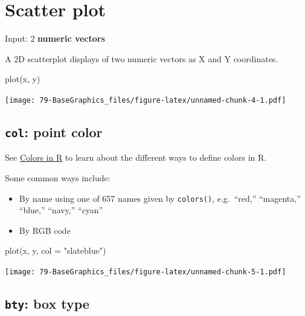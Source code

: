 \documentclass[
]{book}
\newenvironment{Shaded}{\begin{snugshade}}{\end{snugshade}}
\newcommand{\AttributeTok}[1]{\textcolor[rgb]{0.77,0.63,0.00}{#1}}
\newcommand{\FunctionTok}[1]{\textcolor[rgb]{0.00,0.00,0.00}{#1}}
\newcommand{\NormalTok}[1]{#1}
\newcommand{\StringTok}[1]{\textcolor[rgb]{0.31,0.60,0.02}{#1}}
\providecommand{\tightlist}{%
  \setlength{\itemsep}{0pt}\setlength{\parskip}{0pt}}
\begin{document}
\hypertarget{scatter-plot}{%
\section{Scatter plot}\label{scatter-plot}}

Input: 2 \textbf{numeric vectors}

A 2D scatterplot displays of two numeric vectors as X and Y coordinates.

\begin{Shaded}
\begin{Highlighting}[]
\FunctionTok{plot}\NormalTok{(x, y)}
\end{Highlighting}
\end{Shaded}

\texttt{[image: 79-BaseGraphics\_files/figure-latex/unnamed-chunk-4-1.pdf]}

\hypertarget{col-point-color}{%
\subsection{\texorpdfstring{\textbf{\texttt{col}}: point color}{col: point color}}\label{col-point-color}}

See \protect\hyperlink{colors}{Colors in R} to learn about the different ways to define colors in R.

Some common ways include:

\begin{itemize}
\tightlist
\item
  By name using one of 657 names given by \texttt{colors()}, e.g.~``red,'' ``magenta,'' ``blue,'' ``navy,'' ``cyan''
\item
  By RGB code
\end{itemize}

\begin{Shaded}
\begin{Highlighting}[]
\FunctionTok{plot}\NormalTok{(x, y, }\AttributeTok{col =} \StringTok{"slateblue"}\NormalTok{)}
\end{Highlighting}
\end{Shaded}

\texttt{[image: 79-BaseGraphics\_files/figure-latex/unnamed-chunk-5-1.pdf]}

\hypertarget{bty-box-type}{%
\subsection{\texorpdfstring{\textbf{\texttt{bty}}: box type}{bty: box type}}\label{bty-box-type}}
\end{document}
